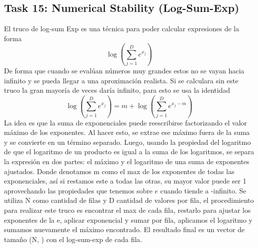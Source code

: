 ﻿\documentclass[12pt]{article}
\begin{document}
\subsection*{Task 15: Numerical Stability (Log-Sum-Exp)}
El truco de log-sum Exp es una técnica para poder calcular expresiones de la forma \[
\log\left(\sum_{j=1}^{D} e^{x_j}\right)
\]
De forma que cuando se evalúan números muy grandes estos no se vayan hacia infinito y se pueda llegar a una aproximación realista. Si se calculara sin este truco la gran mayoría de veces daría infinito, para esto se usa la identidad \[
\log\left(\sum_{j=1}^{D} e^{x_j}\right)
=
m+\log\left(\sum_{j=1}^{D} e^{x_j-m}\right)
\]
La idea es que la suma de exponenciales puede reescribirse factorizando el valor máximo de los exponentes. Al hacer esto, se extrae ese máximo fuera de la suma y se convierte en un término separado. Luego, usando la propiedad del logaritmo de que el logaritmo de un producto es igual a la suma de los logaritmos, se separa la expresión en dos partes: el máximo y el logaritmo de una suma de exponentes ajustados.
Donde denotamos m como el max de los exponentes de todas las exponenciales, así si restamos este a todas las otras, su mayor valor puede ser 1 aprovechando las propiedades que tenemos sobre $e$ cuando tiende a -infinito. Se utiliza N como cantidad de filas y D cantidad de valores por fila, el procedimiento para realizar este truco es encontrar el max de cada fila, restarlo para ajustar los exponentes de la e, aplicar exponencial y sumar por fila, aplicamos el logaritmo y sumamos nuevamente el máximo encontrado. El resultado final es un vector de tamaño (N, ) con el log-sum-exp de cada fila.
\end{document}

